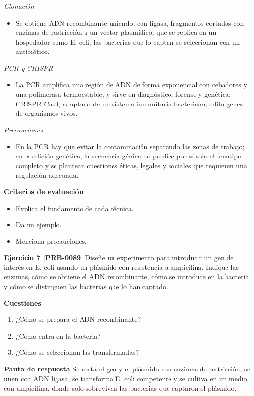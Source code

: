 \documentclass{book}
\begin{document}
\noindent\textit{Clonación}
\begin{itemize}
\item Se obtiene ADN recombinante uniendo, con ligasa, fragmentos cortados con enzimas de restricción a un vector plasmídico, que se replica en un hospedador como E. coli; las bacterias que lo captan se seleccionan con un antibiótico.
\end{itemize}

\noindent\textit{PCR y CRISPR}
\begin{itemize}
\item La PCR amplifica una región de ADN de forma exponencial con cebadores y una polimerasa termoestable, y sirve en diagnóstico, forense y genética; CRISPR-Cas9, adaptado de un sistema inmunitario bacteriano, edita genes de organismos vivos.
\end{itemize}

\noindent\textit{Precauciones}
\begin{itemize}
\item En la PCR hay que evitar la contaminación separando las zonas de trabajo; en la edición genética, la secuencia génica no predice por sí sola el fenotipo completo y se plantean cuestiones éticas, legales y sociales que requieren una regulación adecuada.
\end{itemize}

\noindent\textbf{Criterios de evaluación}
\begin{itemize}
\item Explica el fundamento de cada técnica.
\item Da un ejemplo.
\item Menciona precauciones.
\end{itemize}

\noindent\textbf{Ejercicio 7 [PRB-0089]}
Diseñe un experimento para introducir un gen de interés en E. coli usando un plásmido con resistencia a ampicilina. Indique las enzimas, cómo se obtiene el ADN recombinante, cómo se introduce en la bacteria y cómo se distinguen las bacterias que lo han captado.


\noindent\textbf{Cuestiones}
\begin{enumerate}
\item ¿Cómo se prepara el ADN recombinante?
\item ¿Cómo entra en la bacteria?
\item ¿Cómo se seleccionan las transformadas?
\end{enumerate}

\noindent\textbf{Pauta de respuesta}
Se corta el gen y el plásmido con enzimas de restricción, se unen con ADN ligasa, se transforma E. coli competente y se cultiva en un medio con ampicilina, donde solo sobreviven las bacterias que captaron el plásmido.
\end{document}
